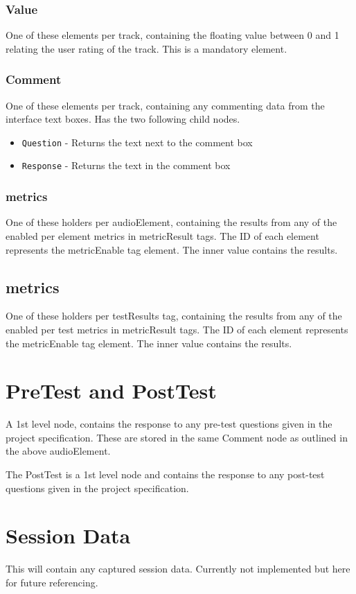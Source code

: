\documentclass{article}
\begin{document}
\subsubsection{Value}
One of these elements per track, containing the floating value between 0 and 1 relating the user rating of the track. This is a mandatory element.

\subsubsection{Comment}
One of these elements per track, containing any commenting data from the interface text boxes. Has the two following child nodes.
\begin{itemize}
\item \texttt{Question} - Returns the text next to the comment box
\item \texttt{Response} - Returns the text in the comment box
\end{itemize}

\subsubsection{metrics}
One of these holders per audioElement, containing the results from any of the enabled per element metrics in metricResult tags. The ID of each element represents the metricEnable tag element. The inner value contains the results.


\subsection{metrics}
One of these holders per testResults tag, containing the results from any of the enabled per test metrics in metricResult tags. The ID of each element represents the metricEnable tag element. The inner value contains the results.


\section{PreTest and PostTest}
A 1st level node, contains the response to any pre-test questions given in the project specification. These are stored in the same Comment node as outlined in the above audioElement.

The PostTest is a 1st level node and contains the response to any post-test questions given in the project specification.

\section{Session Data}
This will contain any captured session data. Currently not implemented but here for future referencing.
\end{document}
